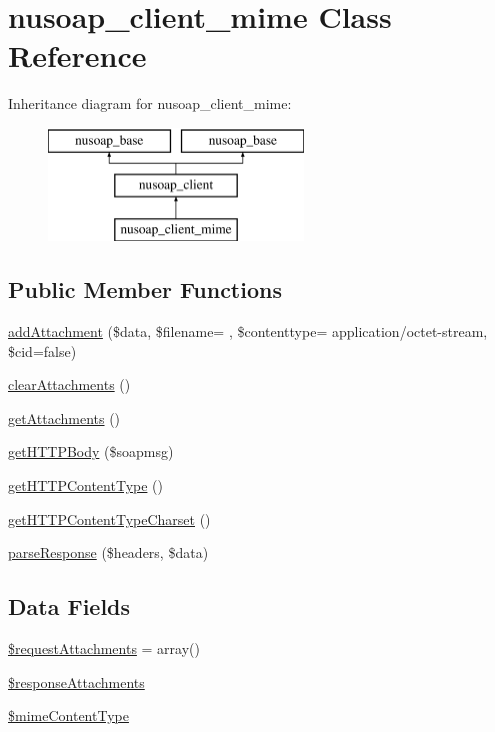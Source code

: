 \hypertarget{classnusoap__client__mime}{}\section{nusoap\+\_\+client\+\_\+mime Class Reference}
\label{classnusoap__client__mime}
Inheritance diagram for nusoap\+\_\+client\+\_\+mime\+:\begin{figure}[H]
\begin{center}
\leavevmode
\includegraphics[height=3.000000cm]{classnusoap__client__mime}
\end{center}
\end{figure}
\subsection*{Public Member Functions}
\begin{DoxyCompactItemize}
\item 
\hyperlink{classnusoap__client__mime_a05ac1d60ed38ac1db78295337c99eb86}{add\+Attachment} (\$data, \$filename= \textquotesingle{}\textquotesingle{}, \$contenttype= \textquotesingle{}application/octet-\/stream\textquotesingle{}, \$cid=false)
\item 
\hyperlink{classnusoap__client__mime_a2b4d4199414b58bc4db009cb17ad8e3b}{clear\+Attachments} ()
\item 
\hyperlink{classnusoap__client__mime_aa91862c4e237ee5b53083f41633babb6}{get\+Attachments} ()
\item 
\hyperlink{classnusoap__client__mime_ab1e22b0858bdbe61d2d711ff442c0e78}{get\+H\+T\+T\+P\+Body} (\$soapmsg)
\item 
\hyperlink{classnusoap__client__mime_a2bed19ef2d537dee244535339cd6026a}{get\+H\+T\+T\+P\+Content\+Type} ()
\item 
\hyperlink{classnusoap__client__mime_a9051db33a9b7e50315d9222ef1c52ce9}{get\+H\+T\+T\+P\+Content\+Type\+Charset} ()
\item 
\hyperlink{classnusoap__client__mime_aca1ed2155629bfc242ddea3636ac24c1}{parse\+Response} (\$headers, \$data)
\end{DoxyCompactItemize}
\subsection*{Data Fields}
\begin{DoxyCompactItemize}
\item 
\hyperlink{classnusoap__client__mime_ac58af5d0476b202790c63410360c4696}{\$request\+Attachments} = array()
\item 
\hyperlink{classnusoap__client__mime_a065527a5618c8bb7597a79b33b410a6e}{\$response\+Attachments}
\item 
\hyperlink{classnusoap__client__mime_afca41a43fc6c89107faf7c34a5dedb32}{\$mime\+Content\+Type}
\end{DoxyCompactItemize}


